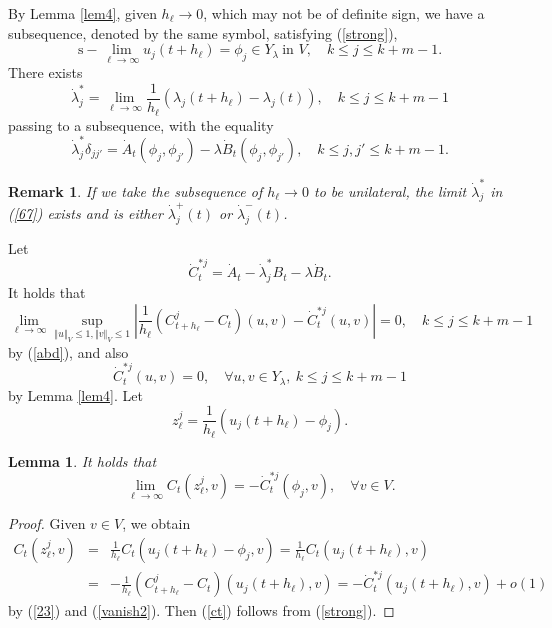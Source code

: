 \documentclass[final,a4paper]{jmsj}
\theoremstyle{thmstyleone}%
\theoremstyle{thmstyletwo}%
\newtheorem{remark}{Remark}%
\theoremstyle{thmstylethree}%
\newtheorem{lemma}[theorem]{Lemma}
\begin{document}
By Lemma \ref{lem4}, given $h_\ell\rightarrow 0$, which may not be of definite sign, we have a subsequence, denoted by the same symbol, satisfying  (\ref{strong}), 
\[ \mbox{s}-\lim_{\ell\rightarrow\infty}u_j(t+h_\ell)=\phi_j\in Y_\lambda \ \mbox{in $V$}, \quad k\leq j\leq k+m-1. \] 
There exists  
\begin{equation} 
\dot\lambda_j^\ast=\lim_{\ell\rightarrow\infty}\frac{1}{h_\ell}(\lambda_j(t+h_\ell)-\lambda_j(t)), \quad k\leq j\leq k+m-1 
 \label{67}
\end{equation} 
passing to a subsequence, with the equality  
\[ \dot\lambda_j^\ast\delta_{jj'}=\dot A_t(\phi_j, \phi_{j'})-\lambda\dot B_t(\phi_j, \phi_{j'}), \quad k\leq j, j'\leq k+m-1.  \] 

\begin{remark}\label{remast}
If we take the subsequence of $h_\ell\rightarrow 0$ to be unilateral, the limit $\dot \lambda_j^\ast$ in (\ref{67}) exists and is either $\dot \lambda_j^+(t)$ or $\dot\lambda_j^-(t)$.  
\end{remark} 

Let 
\[ \dot C_{t}^{\ast j}=\dot A_t-\dot\lambda_j^\ast B_t-\lambda \dot B_t.  \] 
It holds that  
\[ \lim_{\ell\rightarrow \infty}\sup_{\Vert u\Vert_V \leq 1, \Vert v\Vert_V \leq 1}\left\vert \frac{1}{h_\ell}(C_{t+h_\ell}^j-C_t)(u,v)-\dot C_{t}^{\ast j}(u,v)\right\vert =0, \quad k\leq j\leq k+m-1 \] 
by (\ref{abd}), and also   
\begin{equation} 
\dot C_{t}^{\ast j}(u,v)=0, \quad \forall u, v\in Y_\lambda, \ k\leq j\leq k+m-1   
 \label{vanish}
\end{equation} 
by Lemma \ref{lem4}. Let 
\[  
z_{\ell}^j=\frac{1}{h_\ell}(u_j(t+h_\ell)-\phi_j). 
\]   

\begin{lemma}\label{lem6}
It holds that    
\begin{equation} 
\lim_{\ell\rightarrow \infty}C_t(z_{\ell}^j,v)=-\dot C_{t}^{\ast j}(\phi_j, v), \quad \forall v\in V.   
 \label{ct}
\end{equation} 
\end{lemma}
\begin{proof} 
Given $v\in V$, we obtain  
\begin{eqnarray*} 
C_t(z_{\ell}^j,v) & = & \frac{1}{h_\ell}C_t(u_j(t+h_\ell)-\phi_j, v) = \frac{1}{h_\ell}C_t(u_j(t+h_\ell), v) \\ 
& = & -\frac{1}{h_\ell}(C_{t+h_\ell}^j-C_t)(u_j(t+h_\ell),v)=-\dot C_{t}^{\ast j}(u_j(t+h_\ell), v)+o(1) 
\end{eqnarray*} 
by (\ref{23}) and (\ref{vanish2}). Then (\ref{ct}) follows from (\ref{strong}). 
\end{proof} 
\end{document}

